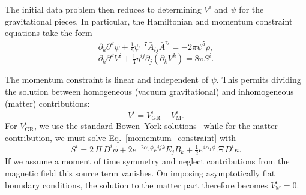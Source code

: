 The initial data problem then reduces to determining $V^i$ and $\psi$ for the gravitational pieces.  In particular, the Hamiltonian and momentum constraint equations take the form
\begin{equation}     
\partial_k\partial^k \psi + \tfrac{1}{8} \psi^{-7} \bar{A}_{ij} \bar{A}^{ij} = - 2\pi \psi^5 \rho ,
\end{equation}
\label{hamiltonian_constraint} 
\begin{equation}
    \partial_k \partial^k V^i + \tfrac{1}{3}\eta^{ij}\partial_j(\partial_k V^k ) = 8 \pi S^i . 
\label{momemtum_constraint}
\end{equation}

The momentum constraint is linear and independent of $\psi$.  This permits dividing the solution between homogeneous (vacuum gravitational) and inhomogeneous (matter) contributions:
\begin{equation}
    V^i = V^i_{\text{GR}} + V^i_{\text{M}}.
\end{equation}
For $V^i_{\text{GR}}$, we use the standard Bowen--York solutions~\cite{Bowen1980} while for the matter contribution, we must solve Eq.~\ref{momemtum_constraint} with 
\begin{equation}
    S^i = 2 \, \Pi \, D^i \phi 
    + 2 e^{-2 \alpha_0 \phi} \epsilon^{ijk} E_j B_k 
    + \tfrac{1}{2}e^{4 \alpha_1 \phi} \, \Xi \, D^i \kappa.
\end{equation}
If we assume a moment of time symmetry and neglect contributions from the magnetic field this source term vanishes.  On imposing asymptotically flat boundary conditions, the solution to the matter part therefore becomes $V^i_{\text{M}}=0$.  

